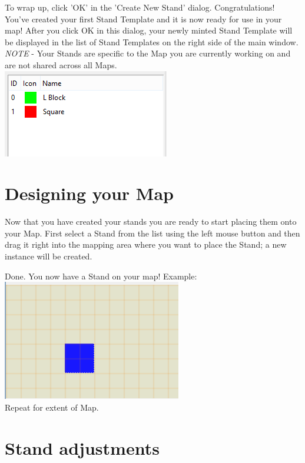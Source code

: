 \documentclass{report}
\begin{document}
To wrap up, click 'OK' in the 'Create New Stand' dialog.  Congratulations!  You've created your first 
Stand Template and it is now ready for use in your map!  After you click OK in this dialog, your newly 
minted Stand Template will be displayed in the list of Stand Templates on the right side of the 
main window.  \\

\emph{NOTE} -  Your Stands are specific to the Map you are currently working on and are not shared
across all Maps.\\


\includegraphics{standtemplateslist.png}\\

\section{Designing your Map}

Now that you have created your stands you are ready to start placing them onto your Map.  
 First select a Stand from the list using the left mouse button and then drag it right into the
 mapping area where you want to place the Stand; a new instance will be created.

Done.  You now have a Stand on your map!  Example:\\

\includegraphics{standingrid.png}\\

Repeat for extent of Map.

\section{Stand adjustments}
\end{document}
